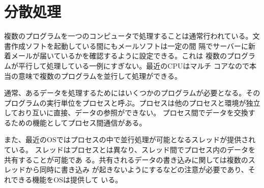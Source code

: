 \section{分散処理}
複数のプログラムを一つのコンピュータで処理することは通常行われている。文
書作成ソフトを起動している間にもメールソフトは一定の間
隔でサーバーに新着メールが届いているかを確認するように設定できる。これは
複数のプログラムが平行して処理している一例にすぎない。最近のCPUはマルチ
コアなので本当の意味で複数のプログラムを並行して処理ができる。

通常、あるデータを処理するためにはいくつかのプログラムが必要となる。その
プログラムの実行単位をプロセスと呼ぶ。プロセスは他のプロセスと環境が独立
しており互いに直接、データの参照ができない。
プロセス間でデータを交換するための機能としてプロセス間通信がある。

また、最近のOSではプロセスの中で並行処理が可能となるスレッドが提供されている。
スレッドはプロセスとは異なり、スレッド間でプロセス内のデータを共有することが可能であ
る。共有されるデータの書き込みに関しては複数のスレッドから同時に書き込み
が起きないようにするなどの注意が必要であり、それできる機能をOSは提供して
いる。
\iffalse
